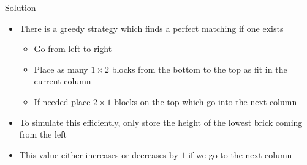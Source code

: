 \begin{frame}
\begin{center}
	\end{center}
	\begin{block}{Solution}
		\begin{itemize}
			\item There is a greedy strategy which finds a perfect matching if one exists
			\pause
			\begin{itemize}
				\item Go from left to right
				\item Place as many $1\times 2$ blocks from the bottom to the top as fit in the current column
				\item If needed place $2\times 1$ blocks on the top which go into the next column 
			\end{itemize}
			\pause[14]
			\item To simulate this efficiently, only store the height of the lowest brick coming from the left%
			\item This value either increases or decreases by $1$ if we go to the next column
		\end{itemize}
	\end{block}
\end{frame}
